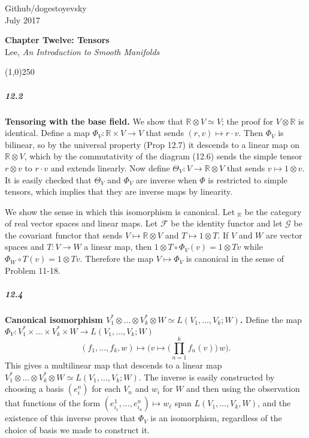 \documentclass[10pt,letter]{article}
\begin{document}
\noindent Github/dogestoyevsky \\
July 2017
\begin{center}
\textbf{Chapter Twelve: Tensors}\\ Lee, \textit{An Introduction to Smooth Manifolds}

\line(1,0){250}
\end{center}
\subparagraph*{12.2} {\bf Tensoring with the base field.} We show that $\mathbb{R} \otimes V \simeq V$; the proof for $V \otimes \mathbb{R}$ is identical. Define a map $\Phi_V: \mathbb{R} \times V \rightarrow V$ that sends $(r,v) \mapsto r \cdot v$.  Then $\Phi_V$ is bilinear, so by the universal property (Prop 12.7) it descends to a linear map on $\mathbb{R} \otimes V$, which by the commutativity of the diagram (12.6) sends the simple tensor $r \otimes v$ to $r \cdot v$ and extends linearly. Now define $\Theta_V: V \rightarrow \mathbb{R} \otimes V$ that sends $v \mapsto 1 \otimes v$. It is easily checked that $\Theta_V$ and $\Phi_V$ are inverse when $\Phi$ is restricted to simple tensors, which implies that they are inverse maps by linearity.

We show the sense in which this isomorphism is canonical. Let $_{\mathbb{R}}$ be the category of real vector spaces and linear maps. Let $\mathcal{F}$ be the identity functor and let $\mathcal{G}$ be the covariant functor that sends $V \mapsto \mathbb{R} \otimes V$ and $T \mapsto 1 \otimes T$. If $V$ and $W$ are vector spaces and $T: V \rightarrow W$ a linear map, then $1 \otimes T \circ \Phi_V (v) = 1 \otimes Tv$ while $\Phi_W \circ T(v) = 1 \otimes Tv$. Therefore the map $V \mapsto \Phi_V$ is canonical in the sense of Problem 11-18. 

\subparagraph*{12.4} {\bf Canonical isomorphism $V_1^{\ast} \otimes ... \otimes V^{\ast}_k \otimes W \simeq L(V_1,...,V_k;W)$.}  Define the map $\Phi_V: V_1^{\ast} \times ... \times V^{\ast}_k \times W \rightarrow L(V_1,...,V_k;W)$   \[ (f_1,...,f_k,w) \mapsto  \bigg( v \mapsto \bigg( \prod_{n=1}^k f_n(v) \bigg) \, w \bigg). \] This gives a multilinear map that descends to a linear map  $V_1^{\ast} \otimes ... \otimes V^{\ast}_k \otimes W \simeq L(V_1,...,V_k;W)$. The inverse is easily constructed by choosing a basis $(e_i^n)$ for each $V_n$ and $w_i$ for $W$ and then using the observation that functions of the form $(e^1_{i_1},...,e^n_{i_n}) \mapsto w_\ell$ span $L(V_1,...,V_k,W)$, and the existence of this inverse proves that $\Phi_V$ is an isomorphism, regardless of the choice of basis we made to construct it. 
\end{document}
